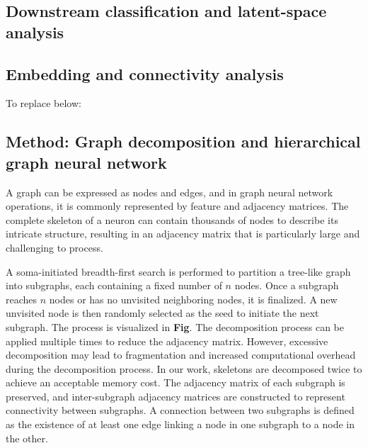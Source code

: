 \documentclass{article}
\begin{document}
\subsection{Downstream classification and latent-space analysis}

\subsection{Embedding and connectivity analysis}

To replace below:
\subsection{Method: Graph decomposition and hierarchical graph neural network}
A graph can be expressed as nodes and edges, and in graph neural network operations, it is commonly represented by feature and adjacency matrices. The complete skeleton of a neuron can contain thousands of nodes to describe its intricate structure, resulting in an adjacency matrix that is particularly large and challenging to process. %

A soma-initiated breadth-first search is performed to partition a tree-like graph into subgraphs, each containing a fixed number of \(n\) nodes. Once a subgraph reaches \(n\) nodes or has no unvisited neighboring nodes, it is finalized. A new unvisited node is then randomly selected as the seed to initiate the next subgraph. The process is visualized in \textbf{Fig}. The decomposition process can be applied multiple times to reduce the adjacency matrix. However, excessive decomposition may lead to fragmentation and increased computational overhead during the decomposition process. In our work, skeletons are decomposed twice to achieve an acceptable memory cost. The adjacency matrix of each subgraph is preserved, and inter-subgraph adjacency matrices are constructed to represent connectivity between subgraphs. A connection between two subgraphs is defined as the existence of at least one edge linking a node in one subgraph to a node in the other.
\end{document}
